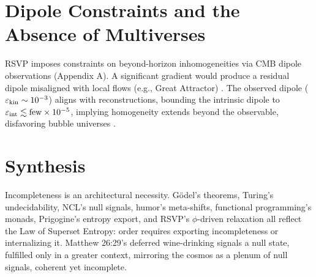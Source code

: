 \documentclass{article}
\begin{document}
\section{Dipole Constraints and the Absence of Multiverses}
\label{sec:dipole}
RSVP imposes constraints on beyond-horizon inhomogeneities via CMB dipole observations (Appendix A). A significant gradient would produce a residual dipole misaligned with local flows (e.g., Great Attractor) \citep{riess1998, perlmutter1999}. The observed dipole (\(\varepsilon_{\rm kin} \sim 10^{-3}\)) aligns with reconstructions, bounding the intrinsic dipole to \(\varepsilon_{\rm int} \lesssim \text{few} \times 10^{-5}\), implying homogeneity extends beyond the observable, disfavoring bubble universes \citep{dodelson2003}.

\section{Synthesis}
\label{sec:synthesis}
Incompleteness is an architectural necessity. G\"{o}del's theorems, Turing's undecidability, NCL's null signals, humor's meta-shifts, functional programming's monads, Prigogine's entropy export, and RSVP's \(\phi\)-driven relaxation all reflect the Law of Superset Entropy: order requires exporting incompleteness or internalizing it. Matthew 26:29's deferred wine-drinking signals a null state, fulfilled only in a greater context, mirroring the cosmos as a plenum of null signals, coherent yet incomplete.

\newpage


\newpage


\end{document}
